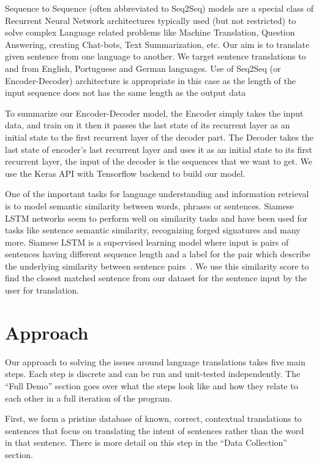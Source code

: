 \documentclass[runningheads]{llncs}
\begin{document}
	Sequence to Sequence (often abbreviated to Seq2Seq) models are a special class of Recurrent Neural Network architectures typically used (but not restricted) to solve complex Language related problems like Machine Translation, Question Answering, creating Chat-bots, Text Summarization, etc. Our aim is to translate given sentence from one language to another. We target sentence translations to and from English, Portuguese and German languages. Use of Seq2Seq (or Encoder-Decoder) architecture is appropriate in this case as the length of the input sequence  does not has the same length as the output data
	
	To summarize our Encoder-Decoder model, the Encoder simply takes the input data, and train on it then it passes the last state of its recurrent layer as an initial state to the first recurrent layer of the decoder part. The Decoder takes the last state of encoder’s last recurrent layer and uses it as an initial state to its first recurrent layer, the input of the decoder is the sequences that we want to get. We use the Keras API with Tensorflow backend to build our model.
	
	One of the important tasks for language understanding and information retrieval is to model semantic similarity between words, phrases or sentences. Siamese LSTM networks seem to perform well on similarity tasks and have been used for tasks like sentence semantic similarity, recognizing forged signatures and many more.
	Siamese LSTM is a supervised learning model where input is pairs of sentences having different sequence length and a label for the pair which describe the underlying similarity between sentence pairs~\cite{ref_url21}. We use this similarity score to find the closest matched sentence from our dataset for the sentence input by the user for translation.
	
	
	\section{Approach}
	Our approach to solving the issues around language translations takes five main steps. Each step is discrete and can be run and unit-tested independently. The ``Full Demo'' section goes over what the steps look like and how they relate to each other in a full iteration of the program. 
	
	First, we form a pristine database of known, correct, contextual translations to sentences that focus on translating the intent of sentences rather than the word in that sentence. There is more detail on this step in the ``Data Collection'' section. 
	
\end{document}
